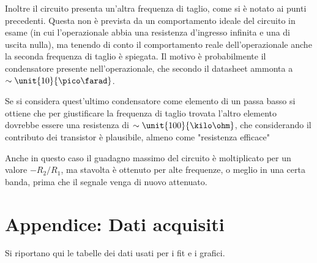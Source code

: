 \documentclass[10pt,a4paper]{article}
\begin{document}
Inoltre il circuito presenta un'altra frequenza di taglio, come si è notato ai punti precedenti. Questa non è prevista da un comportamento ideale del circuito in esame (in cui l'operazionale abbia una resistenza d'ingresso infinita e una di uscita nulla), ma tenendo di conto il comportamento reale dell'operazionale anche la seconda frequenza di taglio è spiegata. Il motivo è probabilmente il condensatore presente nell'operazionale, che secondo il datasheet ammonta a $\sim \unit{10}{\pico\farad}$.

Se si considera quest'ultimo condensatore come elemento di un passa basso si ottiene che per giustificare la frequenza di taglio trovata l'altro elemento dovrebbe essere una resistenza di $\sim \unit{100}{\kilo\ohm}$, che considerando il contributo dei transistor è plausibile, almeno come "resistenza efficace"

Anche in questo caso il guadagno massimo del circuito è moltiplicato per un valore $-R_2/R_1$, ma stavolta è ottenuto per alte frequenze, o meglio in una certa banda, prima che il segnale venga di nuovo attenuato.

\pagebreak
\section{Appendice: Dati acquisiti}
Si riportano qui le tabelle dei dati usati per i fit e i grafici.

\centering
\begin{figure}[h!]
	\begin{minipage}[t]{0.33\textwidth}
		\resizebox{1\textwidth}{!}{
		}
		\label{tab:inv_amp_gain}
	\end{minipage}
	\begin{minipage}[t]{0.33\textwidth}
		\resizebox{1\textwidth}{!}{
		}
		\label{tab:inv_amp_f_domain}
	\end{minipage}
	\begin{minipage}[t]{0.33\textwidth}
		\resizebox{1\textwidth}{!}{
			}
		\label{tab:gain_bandwidth}
	\end{minipage}
\end{figure}

\begin{figure}[h!]
	\centering
	\resizebox{0.7\textwidth}{!}{
	}
	\label{tab:lowpass}
\end{figure}

\begin{figure}[H]
	\centering
	\resizebox{0.7\textwidth}{!}{
	}
	\label{tab:highpass}
\end{figure}
\end{document}
